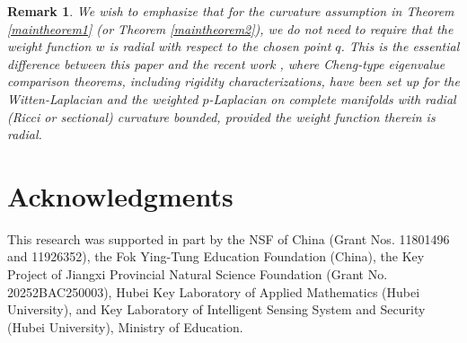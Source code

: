 \documentclass[12pt]{article}
\newtheorem{remark}[theorem]{Remark}
\begin{document}
\begin{remark}
\rm{ We wish to emphasize that for the curvature assumption in
Theorem \ref{maintheorem1} (or Theorem \ref{maintheorem2}), we do
not need to require that the weight function $w$ is radial with
respect to the chosen point $q$. This is the essential difference
between this paper and the recent work \cite{JM-1}, where Cheng-type
eigenvalue comparison theorems, including rigidity
characterizations, have been set up for the Witten-Laplacian and the
weighted $p$-Laplacian on complete manifolds with radial (Ricci or
sectional) curvature bounded, provided the weight function therein
is \emph{radial}. }
\end{remark}




\section*{Acknowledgments}
\renewcommand{\thesection}{\arabic{section}}
\renewcommand{\theequation}{\thesection.\arabic{equation}}
\setcounter{equation}{0} \setcounter{maintheorem}{0}

This research was supported in part by the NSF of China (Grant Nos.
11801496 and 11926352), the Fok Ying-Tung Education Foundation
(China), the Key Project of Jiangxi Provincial Natural Science
Foundation (Grant No. 20252BAC250003), Hubei Key Laboratory of
Applied Mathematics (Hubei University), and Key Laboratory of
Intelligent Sensing System and Security (Hubei University), Ministry
of Education.
\end{document}
